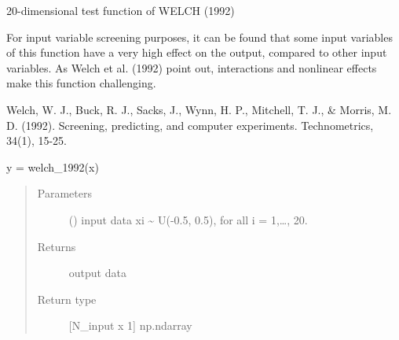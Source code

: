 \documentclass[letterpaper,10pt,english,openany,oneside]{sphinxmanual}
\begin{document}
\begin{fulllineitems}
\label{\detokenize{pygpc:pygpc.testfun.welch_1992}}
20-dimensional test function of WELCH (1992)

For input variable screening purposes, it can be found that some input
variables of this function have a very high effect on the output,
compared to other input variables. As Welch et al. (1992) point out,
interactions and nonlinear effects make this function challenging.

Welch, W. J., Buck, R. J., Sacks, J., Wynn, H. P., Mitchell, T. J., \&
Morris, M. D. (1992). Screening, predicting, and computer experiments.
Technometrics, 34(1), 15-25.

y = welch\_1992(x)
\begin{quote}\begin{description}
\item[{Parameters}] \leavevmode
{} (\sphinxstyleliteralemphasis{\sphinxupquote{{[}}}\sphinxstyleliteralemphasis{\sphinxupquote{{]} }}) \textendash{} input data
xi \textasciitilde{} U(-0.5, 0.5), for all i = 1,…, 20.

\item[{Returns}] \leavevmode
{} \textendash{} output data

\item[{Return type}] \leavevmode
{[}N\_input x 1{]} np.ndarray

\end{description}\end{quote}

\end{fulllineitems}

\end{document}
